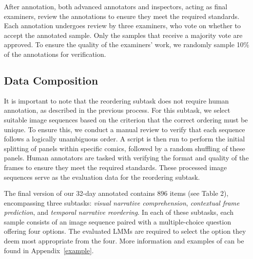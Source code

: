 
After annotation, both advanced annotators and inspectors, acting as final examiners, review the annotations to ensure they meet the required standards. Each annotation undergoes review by three examiners, who vote on whether to accept the annotated sample. Only the samples that receive a majority vote are approved. To ensure the quality of the examiners' work, we randomly sample 10\% of the annotations for verification. 




\subsection{Data Composition}
It is important to note that the reordering subtask does not require human annotation, as described in the previous process. For this subtask, we select suitable image sequences based on the criterion that the correct ordering must be unique. To ensure this, we conduct a manual review to verify that each sequence follows a logically unambiguous order. A script is then run to perform the initial splitting of panels within specific comics, followed by a random shuffling of these panels. Human annotators are tasked with verifying the format and quality of the frames to ensure they meet the required standards. These processed image sequences serve as the evaluation data for the reordering subtask.

The final version of our 32-day annotated \dataset contains 896 items (see Table 2), encompassing three subtasks: \textit{visual narrative comprehension}, \textit{contextual frame prediction}, and \textit{temporal narrative reordering}. In each of these subtasks, each sample consists of an image sequence paired with a multiple-choice question offering four options. The evaluated LMMs are required to select the option they deem most appropriate from the four. More information and examples of \dataset can be found in Appendix~\ref{example}. 



